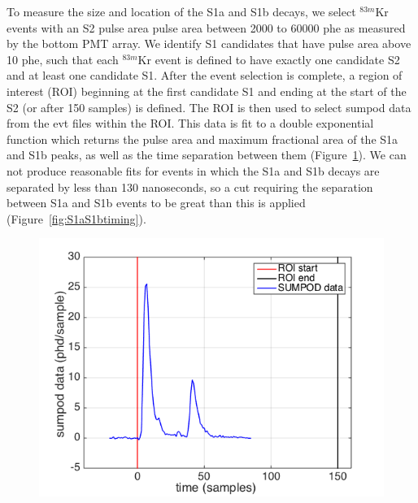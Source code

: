 \documentclass[a4paper,10pt,twocolumn]{article}
\begin{document}
To measure the size and location of the S1a and S1b decays, we select $^{83m}$Kr events with an S2 pulse area pulse area between 2000 to 60000 phe as measured by the bottom PMT array.  We identify S1 candidates that have pulse area above 10 phe, such that each $^{83m}$Kr event is defined to have exactly one candidate S2 and at least one candidate S1.  After the event selection is complete, a region of interest (ROI) beginning at the first candidate S1 and ending at the start of the S2 (or after 150 samples) is defined. The ROI is then used to select sumpod data from the evt files within the ROI.  This data is  fit to a double exponential function which returns the pulse area and maximum fractional area of the S1a and S1b peaks, as well as the time separation between them (Figure~\ref{fig:Sumpod}). We can not produce reasonable fits for events in which the S1a and S1b decays are separated by less than 130 nanoseconds, so a cut requiring the separation between S1a and S1b events to be great than this is applied  (Figure~\ref{fig:S1aS1btiming}).

\begin{figure}
\includegraphics[scale=0.4]{Run04Corrections/s1a_s1b_sumpod.png}
 \label{fig:Sumpod}
\end{figure}
\end{document}
